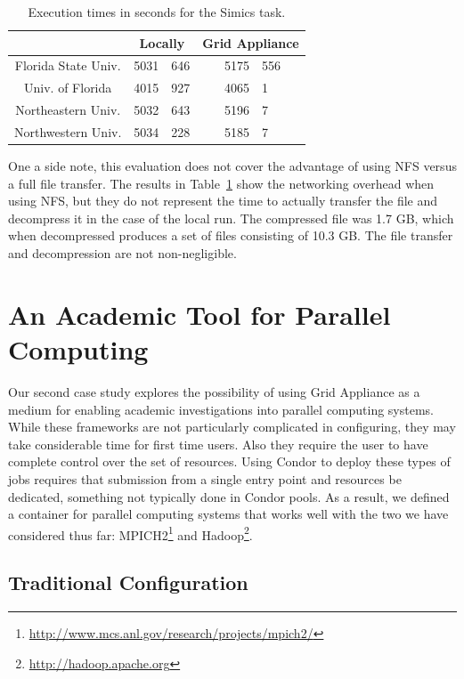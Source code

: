 \documentclass[twocolumn]{svjour3}
\begin{document}
\begin{table}[ht]
\small{
\centering
\begin{tabular}[c]{|c|r@{.}lr@{.}l|} \hline
& \multicolumn{2}{c}{Locally} & \multicolumn{2}{c|}{Grid Appliance} \\ \hline \hline
Florida State Univ. & 5031&646 & 5175&556 \\ \hline
Univ. of Florida & 4015&927 & 4065&1 \\ \hline
Northeastern Univ. & 5032&643 & 5196&7 \\ \hline
Northwestern Univ. & 5034&228 & 5185&7 \\ \hline
\end{tabular}
\caption{Execution times in seconds for the Simics task.}
\label{tab:simics}
}
\end{table}

One a side note, this evaluation does not cover the advantage of using NFS
versus a full file transfer.  The results in Table~\ref{tab:simics} show the
networking overhead when using NFS, but they do not represent the time to
actually transfer the file and decompress it in the case of the local run.  The
compressed file was 1.7 GB, which when decompressed produces a set of files
consisting of 10.3 GB.  The file transfer and decompression are not
non-negligible.

\section{An Academic Tool for Parallel Computing}

Our second case study explores the possibility of using Grid Appliance as a
medium for enabling academic investigations into parallel computing systems.
While these frameworks are not particularly complicated in configuring, they
may take considerable time for first time users.  Also they require the user to
have complete control over the set of resources.  Using Condor to deploy these
types of jobs requires that submission from a single entry point and resources
be dedicated, something not typically done in Condor pools.  As a result, we
defined a container for parallel computing systems that works well with the two
we have considered thus far:
MPICH2\footnote{\url{http://www.mcs.anl.gov/research/projects/mpich2/}} and
Hadoop\footnote{\url{http://hadoop.apache.org}}.

\subsection{Traditional Configuration}
\end{document}
